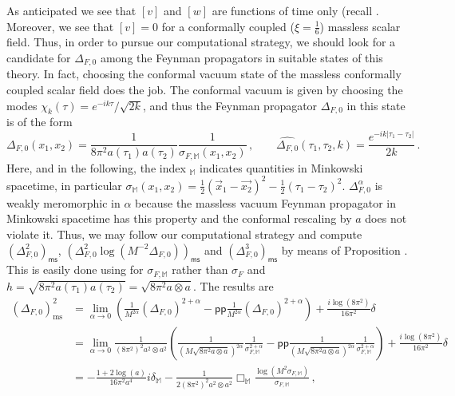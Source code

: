 \documentclass[10pt]{book}
\newcommand{\pp}{\mathsf{pp}}
\newcommand{\ms}{\mathsf{ms}}
\theoremstyle{break}
\begin{document}
As anticipated we see that $[v]$ and $[w]$ are functions of time only (recall %
. Moreover, we see that $[v]=0$ for a conformally coupled ($\xi=\frac16$) massless scalar field. Thus, in order to pursue our computational strategy, we should look for a candidate for $\Delta_{F,0}$ among the Feynman propagators in suitable states of this theory. In fact, choosing the conformal vacuum state of the massless conformally coupled scalar field does the job. The conformal vacuum is given by choosing the modes $\chi_k(\tau)=e^{-ik\tau}/\sqrt{2k}$, and thus the Feynman propagator $\Delta_{F,0}$ in this state is of the form
\begin{equation*}%
\Delta_{F,0}(x_1,x_2)=\frac{1}{8\pi^2 a(\tau_1)a(\tau_2)}\frac{1}{\sigma_{F,\mathbb{M}}(x_1,x_2)}\,,\qquad \widehat{\Delta_{F,0}}(\tau_1,\tau_2,k)=\frac{e^{-ik|\tau_1-\tau_2|}}{2k}\,.
\end{equation*}
Here, and in the following, the index $_{\mathbb{M}}$ indicates quantities in Minkowski spacetime, in particular $\sigma_{\mathbb{M}}(x_1,x_2)=\frac12(\vec{x}_1-\vec{x_2})^2-\frac12(\tau_1-\tau_2)^2$. $\Delta^\alpha_{F,0}$ is weakly meromorphic in $\alpha$ because the massless vacuum Feynman propagator in Minkowski spacetime has this property and the conformal rescaling by $a$ does not violate it. Thus, we may follow our computational strategy and compute $\left(\Delta^2_{F,0}\right)_\ms$, $\left(\Delta^2_{F,0}\log \left(M^{-2} \Delta_{F,0}\right)\right)_\ms$ and  $\left(\Delta^3_{F,0}\right)_\ms$ by means of Proposition %
. This is easily done using %
for $\sigma_{F,\mathbb{M}}$ rather than $\sigma_F$ and $h=\sqrt{8\pi^2 a(\tau_1)a(\tau_2)}=\sqrt{8\pi^2 a\otimes a}$. The results are
\begin{align*}
(\Delta_{F,0})^2_\text{ms}&= \lim_{\alpha\to 0}\left(\frac{1}{M^{2\alpha}}(\Delta_{F,0})^{2+\alpha}-\pp\frac{1}{M^{2\alpha}}(\Delta_{F,0})^{2+\alpha}\right)+\frac{i\log(8\pi^2)}{16\pi^2}\delta\\
&= \lim_{\alpha\to 0}\frac{1}{(8\pi^2)^2a^2\otimes a^2}\left(\frac{1}{(M\sqrt{8\pi^2 a\otimes a})^{2\alpha}}\frac{1}{\sigma_{F,\mathbb{M}}^{2+\alpha}}-\pp \frac{1}{(M\sqrt{8\pi^2 a\otimes a})^{2\alpha}}\frac{1}{\sigma_{F,\mathbb{M}}^{2+\alpha}}\right)+\frac{i\log(8\pi^2)}{16\pi^2}\delta\\
&=-\frac{1+2\log (a)}{16\pi^2 a^4}i\delta_\mathbb{M}-\frac{1}{2(8\pi^2)^2 a^2\otimes a^2}\Box_{\mathbb{M}}\frac{\log\left(M^2\sigma_{F,\mathbb{M}}\right)}{\sigma_{F,\mathbb{M}}}\,,
\end{align*}
\end{document}
